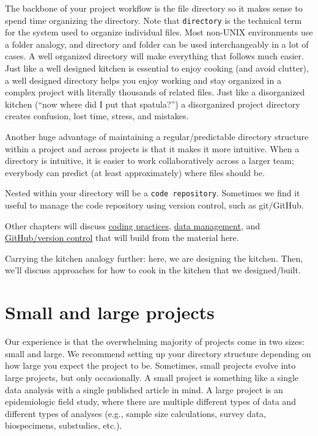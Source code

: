 \documentclass[]{book}
\begin{document}
The backbone of your project workflow is the file directory so it makes sense to spend time organizing the directory. Note that \texttt{directory} is the technical term for the system used to organize individual files. Most non-UNIX environments use a folder analogy, and directory and folder can be used interchangeably in a lot of cases. A well organized directory will make everything that follows much easier. Just like a well designed kitchen is essential to enjoy cooking (and avoid clutter), a well designed directory helps you enjoy working and stay organized in a complex project with literally thousands of related files. Just like a disorganized kitchen (``now where did I put that spatula?'') a disorganized project directory creates confusion, lost time, stress, and mistakes.

Another huge advantage of maintaining a regular/predictable directory structure within a project and across projects is that it makes it more intuitive. When a directory is intuitive, it is easier to work collaboratively across a larger team; everybody can predict (at least approximately) where files should be.

Nested within your directory will be a \texttt{code\ repository}. Sometimes we find it useful to manage the code repository using version control, such as git/GitHub.

Other chapters will discuss \protect\hyperlink{codingpractices}{coding practices}, \protect\hyperlink{datamanagement}{data management}, and \protect\hyperlink{github}{GitHub/version control} that will build from the material here.

Carrying the kitchen analogy further: here, we are designing the kitchen. Then, we'll discuss approaches for how to cook in the kitchen that we designed/built.

\hypertarget{small-and-large-projects}{%
\section{Small and large projects}\label{small-and-large-projects}}

Our experience is that the overwhelming majority of projects come in two sizes: small and large. We recommend setting up your directory structure depending on how large you expect the project to be. Sometimes, small projects evolve into large projects, but only occasionally. A small project is something like a single data analysis with a single published article in mind. A large project is an epidemiologic field study, where there are multiple different types of data and different types of analyses (e.g., sample size calculations, survey data, biospecimens, substudies, etc.).
\end{document}

